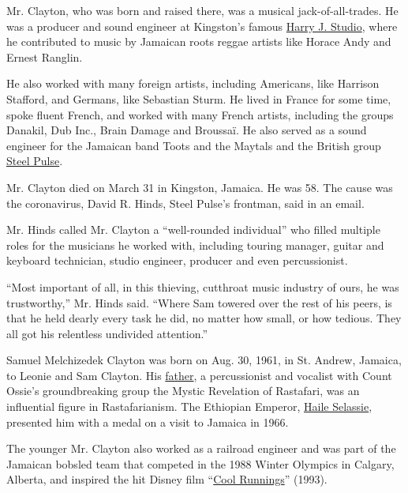 Mr. Clayton, who was born and raised there, was a musical
jack-of-all-trades. He was a producer and sound engineer at Kingston's
famous \href{https://harryjstudio.com/}{Harry J. Studio}, where he
contributed to music by Jamaican roots reggae artists like Horace Andy
and Ernest Ranglin.

He also worked with many foreign artists, including Americans, like
Harrison Stafford, and Germans, like Sebastian Sturm. He lived in France
for some time, spoke fluent French, and worked with many French artists,
including the groups Danakil, Dub Inc., Brain Damage and Broussaï. He
also served as a sound engineer for the Jamaican band Toots and the
Maytals and the British group \href{https://steelpulse.com/}{Steel
Pulse}.

Mr. Clayton died on March 31 in Kingston, Jamaica. He was 58. The cause
was the coronavirus, David R. Hinds, Steel Pulse's frontman, said in an
email.

Mr. Hinds called Mr. Clayton a ``well-rounded individual'' who filled
multiple roles for the musicians he worked with, including touring
manager, guitar and keyboard technician, studio engineer, producer and
even percussionist.

``Most important of all, in this thieving, cutthroat music industry of
ours, he was trustworthy,'' Mr. Hinds said. ``Where Sam towered over the
rest of his peers, is that he held dearly every task he did, no matter
how small, or how tedious. They all got his relentless undivided
attention.''

Samuel Melchizedek Clayton was born on Aug. 30, 1961, in St. Andrew,
Jamaica, to Leonie and Sam Clayton. His
\href{https://thevinylfactory.com/features/sam-clayton-mystic-revelation-of-rastafari/}{father},
a percussionist and vocalist with Count Ossie's groundbreaking group the
Mystic Revelation of Rastafari, was an influential figure in
Rastafarianism. The Ethiopian Emperor,
\href{https://www.nytimes3xbfgragh.onion/1975/08/28/archives/haile-selassie-of-ethiopia-dies-at-83-deposed-emperor-ruled-ancient.html}{Haile
Selassie}, presented him with a medal on a visit to Jamaica in 1966.

The younger Mr. Clayton also worked as a railroad engineer and was part
of the Jamaican bobsled team that competed in the 1988 Winter Olympics
in Calgary, Alberta, and inspired the hit Disney film
``\href{https://www.nytimes3xbfgragh.onion/1993/10/01/movies/reviews-film-not-so-tough-sledding-from-4-unlikely-olympians.html}{Cool
Runnings}'' (1993).

